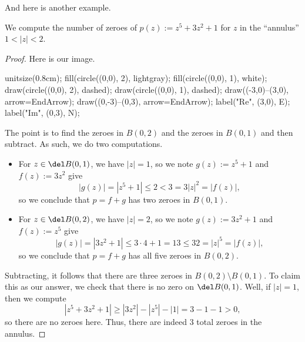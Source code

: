 And here is another example.
\begin{exe}
	We compute the number of zeroes of $p(z):=z^5+3z^2+1$ for $z$ in the ``annulus'' $1<|z|<2$.
\end{exe}
\begin{proof}
	Here is our image.
	\begin{center}
		\begin{asy}
			unitsize(0.8cm);
			fill(circle((0,0), 2), lightgray);
			fill(circle((0,0), 1), white);
			draw(circle((0,0), 2), dashed);
			draw(circle((0,0), 1), dashed);
			draw((-3,0)--(3,0), arrow=EndArrow);
			draw((0,-3)--(0,3), arrow=EndArrow);
			label("$\textrm{Re}$", (3,0), E);
			label("$\textrm{Im}$", (0,3), N);
		\end{asy}
	\end{center}
	The point is to find the zeroes in $B(0,2)$ and the zeroes in $B(0,1)$ and then subtract. As such, we do two computations.
	\begin{itemize}
		\item For $z\in\del B(0,1)$, we have $|z|=1$, so we note $g(z):=z^5+1$ and $f(z):=3z^2$ give
		\[|g(z)|=\left|z^5+1\right|\le2<3=3|z|^2=|f(z)|,\]
		so we conclude that $p=f+g$ has two zeroes in $B(0,1)$.
		\item For $z\in\del B(0,2)$, we have $|z|=2$, so we note $g(z):=3z^2+1$ and $f(z):=z^5$ give
		\[|g(z)|=\left|3z^2+1\right|\le3\cdot4+1=13\le32=|z|^5=|f(z)|,\]
		so we conclude that $p=f+g$ has all five zeroes in $B(0,2)$.
	\end{itemize}
	Subtracting, it follows that there are three zeroes in $B(0,2)\setminus B(0,1)$. To claim this as our answer, we check that there is no zero on $\del B(0,1)$. Well, if $|z|=1$, then we compute
	\[\left|z^5+3z^2+1\right|\ge\left|3z^2\right|-\left|z^5\right|-|1|=3-1-1>0,\]
	so there are no zeroes here. Thus, there are indeed $\boxed3$ total zeroes in the annulus.
\end{proof}

